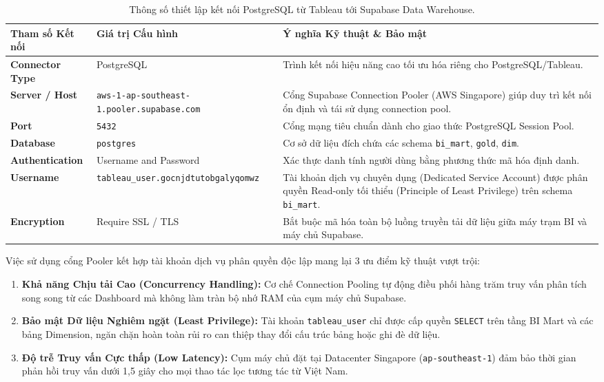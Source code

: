 \documentclass[12pt, a4paper]{report}
\begin{document}
\begin{table}[H]
\centering
\small
\renewcommand{\arraystretch}{1.25}
\begin{tabularx}{\textwidth}{@{} l l X @{}}
\toprule
\textbf{Tham số Kết nối} & \textbf{Giá trị Cấu hình} & \textbf{Ý nghĩa Kỹ thuật \& Bảo mật} \\
\midrule
\textbf{Connector Type} & PostgreSQL & Trình kết nối hiệu năng cao tối ưu hóa riêng cho PostgreSQL/Tableau. \\
\textbf{Server / Host} & \texttt{aws-1-ap-southeast-1.pooler.supabase.com} & Cổng Supabase Connection Pooler (AWS Singapore) giúp duy trì kết nối ổn định và tái sử dụng connection pool. \\
\textbf{Port} & \texttt{5432} & Cổng mạng tiêu chuẩn dành cho giao thức PostgreSQL Session Pool. \\
\textbf{Database} & \texttt{postgres} & Cơ sở dữ liệu đích chứa các schema \texttt{bi\_mart}, \texttt{gold}, \texttt{dim}. \\
\textbf{Authentication} & Username and Password & Xác thực danh tính người dùng bằng phương thức mã hóa định danh. \\
\textbf{Username} & \texttt{tableau\_user.gocnjdtutobgalyqomwz} & Tài khoản dịch vụ chuyên dụng (Dedicated Service Account) được phân quyền Read-only tối thiểu (Principle of Least Privilege) trên schema \texttt{bi\_mart}. \\
\textbf{Encryption} & Require SSL / TLS & Bắt buộc mã hóa toàn bộ luồng truyền tải dữ liệu giữa máy trạm BI và máy chủ Supabase. \\
\bottomrule
\end{tabularx}
\caption{Thông số thiết lập kết nối PostgreSQL từ Tableau tới Supabase Data Warehouse.}
\label{tab:tableau_connection_params}
\end{table}

Việc sử dụng cổng Pooler kết hợp tài khoản dịch vụ phân quyền độc lập mang lại 3 ưu điểm kỹ thuật vượt trội:
\begin{enumerate}[label=\arabic*., leftmargin=*]
    \item \textbf{Khả năng Chịu tải Cao (Concurrency Handling):} Cơ chế Connection Pooling tự động điều phối hàng trăm truy vấn phân tích song song từ các Dashboard mà không làm tràn bộ nhớ RAM của cụm máy chủ Supabase.
    \item \textbf{Bảo mật Dữ liệu Nghiêm ngặt (Least Privilege):} Tài khoản \texttt{tableau\_user} chỉ được cấp quyền \texttt{SELECT} trên tầng BI Mart và các bảng Dimension, ngăn chặn hoàn toàn rủi ro can thiệp thay đổi cấu trúc bảng hoặc ghi đè dữ liệu.
    \item \textbf{Độ trễ Truy vấn Cực thấp (Low Latency):} Cụm máy chủ đặt tại Datacenter Singapore (\texttt{ap-southeast-1}) đảm bảo thời gian phản hồi truy vấn dưới 1,5 giây cho mọi thao tác lọc tương tác từ Việt Nam.
\end{enumerate}
\end{document}
